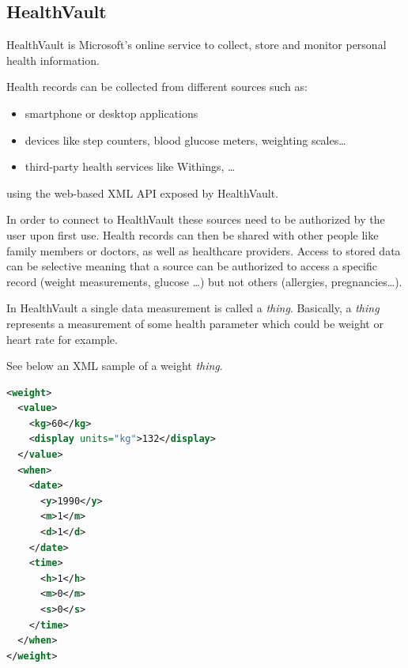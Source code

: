 \subsection{HealthVault} \nocite{HealthVault}

HealthVault is Microsoft's online service to collect, store and monitor personal health information.


Health records can be collected from different sources such as:
\begin{itemize}
\item smartphone or desktop applications
\item devices like step counters, blood glucose meters, weighting scales\ldots
\item third-party health services like Withings, \ldots
\end{itemize}
using the web-based XML API exposed by HealthVault.

In order to connect to HealthVault these sources need to be authorized by the user upon first use.
Health records can then be shared with other people like family members or doctors, as well as
healthcare providers. Access to stored data can be selective meaning that a source can be authorized to access a specific record (weight measurements, glucose \ldots) but not others (allergies, pregnancies\ldots).






In HealthVault a single data measurement is called a \textit{thing}.
Basically, a \textit{thing} represents a measurement of some health parameter
which could be weight or heart rate for example.

See below an XML sample of a weight \textit{thing}.
\begin{lstlisting}[language=XML]
<weight>
  <value>
    <kg>60</kg>
    <display units="kg">132</display>
  </value>
  <when>
    <date>
      <y>1990</y>
      <m>1</m>
      <d>1</d>
    </date>
    <time>
      <h>1</h>
      <m>0</m>
      <s>0</s>
    </time>
  </when>
</weight>
\end{lstlisting}


